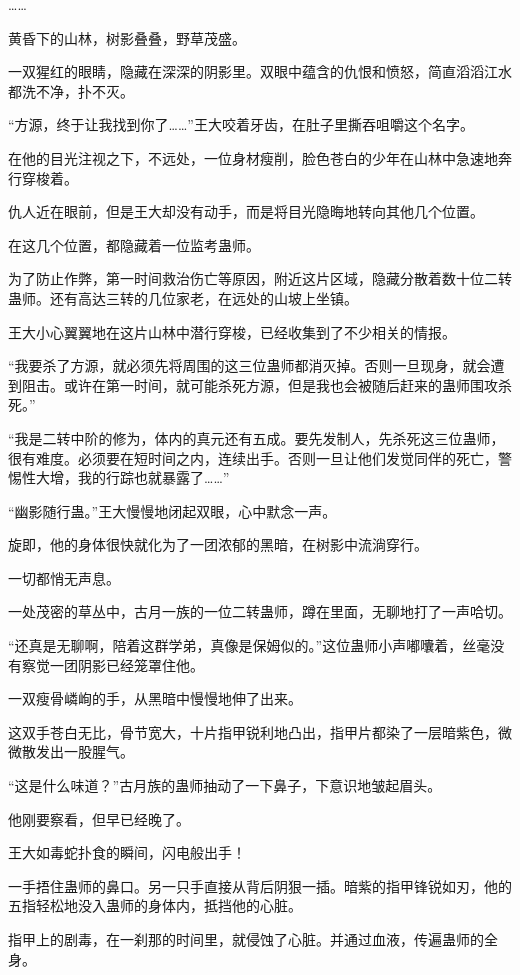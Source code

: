 \begin{this_body}
……

黄昏下的山林，树影叠叠，野草茂盛。

一双猩红的眼睛，隐藏在深深的阴影里。双眼中蕴含的仇恨和愤怒，简直滔滔江水都洗不净，扑不灭。

“方源，终于让我找到你了……”王大咬着牙齿，在肚子里撕吞咀嚼这个名字。

在他的目光注视之下，不远处，一位身材瘦削，脸色苍白的少年在山林中急速地奔行穿梭着。

仇人近在眼前，但是王大却没有动手，而是将目光隐晦地转向其他几个位置。

在这几个位置，都隐藏着一位监考蛊师。

为了防止作弊，第一时间救治伤亡等原因，附近这片区域，隐藏分散着数十位二转蛊师。还有高达三转的几位家老，在远处的山坡上坐镇。

王大小心翼翼地在这片山林中潜行穿梭，已经收集到了不少相关的情报。

“我要杀了方源，就必须先将周围的这三位蛊师都消灭掉。否则一旦现身，就会遭到阻击。或许在第一时间，就可能杀死方源，但是我也会被随后赶来的蛊师围攻杀死。”

“我是二转中阶的修为，体内的真元还有五成。要先发制人，先杀死这三位蛊师，很有难度。必须要在短时间之内，连续出手。否则一旦让他们发觉同伴的死亡，警惕性大增，我的行踪也就暴露了……”

“幽影随行蛊。”王大慢慢地闭起双眼，心中默念一声。

旋即，他的身体很快就化为了一团浓郁的黑暗，在树影中流淌穿行。

一切都悄无声息。

一处茂密的草丛中，古月一族的一位二转蛊师，蹲在里面，无聊地打了一声哈切。

“还真是无聊啊，陪着这群学弟，真像是保姆似的。”这位蛊师小声嘟囔着，丝毫没有察觉一团阴影已经笼罩住他。

一双瘦骨嶙峋的手，从黑暗中慢慢地伸了出来。

这双手苍白无比，骨节宽大，十片指甲锐利地凸出，指甲片都染了一层暗紫色，微微散发出一股腥气。

“这是什么味道？”古月族的蛊师抽动了一下鼻子，下意识地皱起眉头。

他刚要察看，但早已经晚了。

王大如毒蛇扑食的瞬间，闪电般出手！

一手捂住蛊师的鼻口。另一只手直接从背后阴狠一插。暗紫的指甲锋锐如刃，他的五指轻松地没入蛊师的身体内，抵挡他的心脏。

指甲上的剧毒，在一刹那的时间里，就侵蚀了心脏。并通过血液，传遍蛊师的全身。


\end{this_body}

